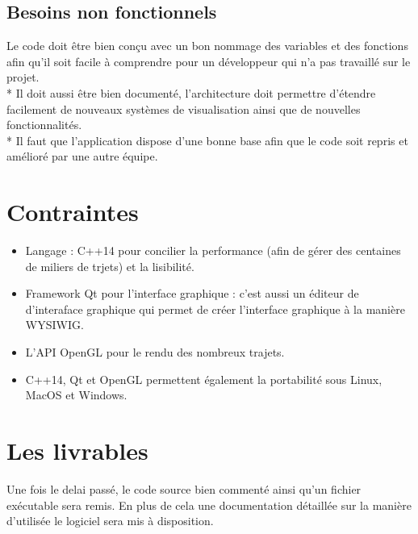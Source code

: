 \documentclass[12pt]{article}
\begin{document}
		\subsection{Besoins non fonctionnels}
			Le code doit être bien conçu avec un bon nommage des variables et des fonctions afin qu'il soit facile à comprendre pour un développeur qui n'a pas travaillé sur le projet.\\*
			Il doit aussi être bien documenté, l'architecture doit permettre d'étendre facilement de nouveaux systèmes de visualisation ainsi que de nouvelles fonctionnalités.\\*
			Il faut que l'application dispose d'une bonne base afin que le code soit repris et amélioré par une autre équipe.

	\section{Contraintes}
		\begin{itemize}
			\item Langage : C++14 pour concilier la performance (afin de gérer des centaines de miliers de trjets) et la lisibilité.
			\item Framework Qt pour l'interface graphique : c'est aussi un éditeur de d'interaface graphique qui permet de créer l'interface graphique à la manière WYSIWIG.
			\item L'API OpenGL pour le rendu des nombreux trajets.
			\item C++14, Qt et OpenGL permettent également la portabilité sous Linux, MacOS et Windows.
		\end{itemize}

	\section{Les livrables}
		Une fois le delai passé, le code source bien commenté ainsi qu'un fichier exécutable sera remis. En plus de cela une documentation détaillée sur la manière d'utilisée le logiciel sera mis à disposition.
\end{document}
